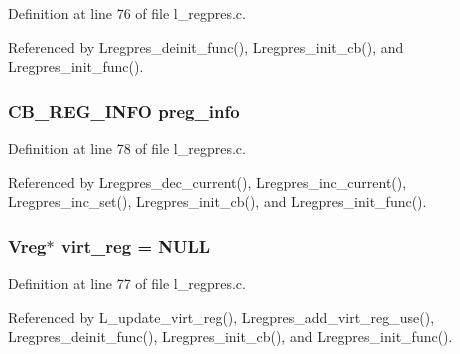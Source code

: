 Definition at line 76 of file l\_\-regpres.c.

Referenced by Lregpres\_\-deinit\_\-func(), Lregpres\_\-init\_\-cb(), and Lregpres\_\-init\_\-func().
\subsubsection{\setlength{\rightskip}{0pt plus 5cm}\bf{CB\_\-REG\_\-INFO} \bf{preg\_\-info}}\label{l__regpres_8c_0647b4f1b08b4ccefd9a78e4a6ab1b54}




Definition at line 78 of file l\_\-regpres.c.

Referenced by Lregpres\_\-dec\_\-current(), Lregpres\_\-inc\_\-current(), Lregpres\_\-inc\_\-set(), Lregpres\_\-init\_\-cb(), and Lregpres\_\-init\_\-func().
\subsubsection{\setlength{\rightskip}{0pt plus 5cm}\bf{Vreg}$\ast$ \bf{virt\_\-reg} = \bf{NULL}}\label{l__regpres_8c_634254654ecb462669c4a093390bfbc3}




Definition at line 77 of file l\_\-regpres.c.

Referenced by L\_\-update\_\-virt\_\-reg(), Lregpres\_\-add\_\-virt\_\-reg\_\-use(), Lregpres\_\-deinit\_\-func(), Lregpres\_\-init\_\-cb(), and Lregpres\_\-init\_\-func().